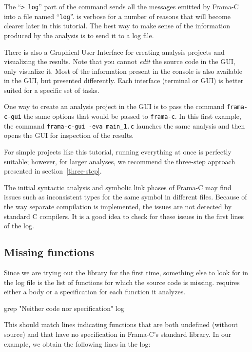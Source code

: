 \documentclass{frama-c-book}
\begin{document}
The ``\lstinline|> log|'' part of the command sends all
the messages emitted by Frama-C into a file named
``\lstinline|log|''. \Eva{} is verbose for a number of reasons that
will become clearer later in this tutorial.
The best way to make sense of the information
produced by the analysis is
to send it to a log file.

There is also a Graphical User Interface
for creating analysis projects and
visualizing the results.
Note that you cannot {\em edit} the source code in the GUI, only visualize it.
Most of the information present in the console is also available in the GUI,
but presented differently. Each interface (terminal or GUI) is better suited
for a specific set of tasks.

One way to create an analysis project in the GUI
is to pass the command \lstinline|frama-c-gui| the same options
that would be passed to \lstinline|frama-c|. In this first example,
the command \lstinline|frama-c-gui -eva main_1.c| launches
the same analysis and then opens the GUI for inspection of the results.

\begin{important}
  For simple projects like this tutorial, running everything at once
  is perfectly suitable; however, for larger analyses, we recommend the
  three-step approach presented in section~\ref{three-step}.
\end{important}

The initial syntactic analysis and symbolic link phases
of Frama-C may find issues such as
inconsistent types for the same symbol in different files.
Because of the way separate compilation is implemented,
the issues are not detected by standard C compilers.
It is a good idea to check for these issues in the first
lines of the log.

\subsection{Missing functions}

Since we are trying out the library for the first time,
something else to look for in the log file is the list of functions for
which the source code is missing. \Eva{} requires
either a body or a specification for each function it analyzes.

\begin{frama-c-commands}
grep "Neither code nor specification" log
\end{frama-c-commands}

This should match lines indicating functions that are both undefined
(without source) and that have no specification in Frama-C's standard library.
In our example, we obtain the following lines in the log:
\end{document}
